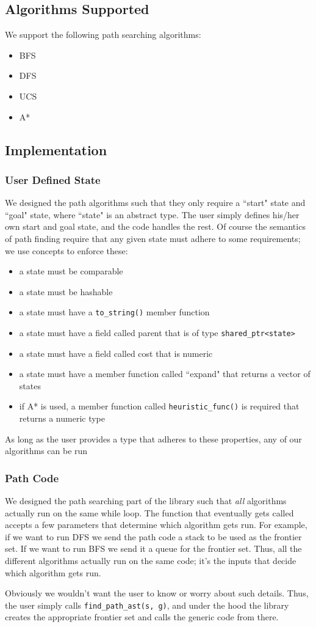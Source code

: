 \documentclass{article}
\begin{document}
\subsection{Algorithms Supported}
We support the following path searching algorithms: 
\begin{itemize}
\item BFS
\item DFS
\item UCS
\item A*
\end{itemize}

\subsection{Implementation}
\subsubsection{User Defined State}
We designed the path algorithms such that they only require a ``start" state and ``goal" state, where ``state" is an abstract type. The user simply defines his/her own start and goal state, and the code handles the rest. Of course the semantics of path finding require that any given state must adhere to some requirements; we use concepts to enforce these:
\begin{itemize}
\item a state must be comparable
\item a state must be hashable
\item a state must have a \texttt{to\_string()} member function
\item a state must have a field called parent that is of type \texttt{shared\_ptr<state>}
\item a state must have a field called cost that is numeric
\item a state must have a member function called ``expand" that returns a vector of states
\item if A* is used, a member function called \texttt{heuristic\_func()} is required that returns a numeric type
\end{itemize}
As long as the user provides a type that adheres to these properties, any of our algorithms can be run

\subsubsection{Path Code}
We designed the path searching part of the library such that \emph{all} algorithms actually run on the same while loop. The function that eventually gets called accepts a few parameters that determine which algorithm gets run. For example, if we want to run DFS we send the path code a stack to be used as the frontier set. If we want to run BFS we send it a queue for the frontier set. Thus, all the different algorithms actually run on the same code; it's the inputs that decide which algorithm gets run. 
\par
Obviously we wouldn't want the user to know or worry about such details. Thus, the user simply calls \texttt{find\_path\_ast(s, g)}, and under the hood the library creates the appropriate frontier set and calls the generic code from there.
\end{document}
